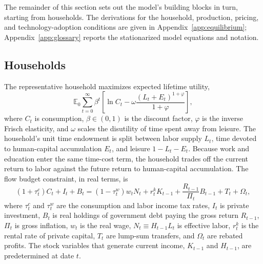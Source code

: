 \documentclass[a4paper,11pt]{article}
\begin{document}
The remainder of this section sets out the model's building blocks in turn, starting from households.
The derivations for the household, production, pricing, and technology-adoption conditions are given in Appendix~\ref{app:equilibrium}; Appendix~\ref{app:glossary} reports the stationarized model equations and notation.

\subsection{Households}

The representative household maximizes expected lifetime utility,
\begin{equation} \label{eq:utility}
    \mathbb{E}_0 \sum_{t=0}^{\infty} \beta^t \left[\ln C_t - \omega \frac{\left(L_t + E_t\right)^{1+\varphi}}{1+\varphi}\right],
\end{equation}
where $C_t$ is consumption, $\beta \in (0,1)$ is the discount factor, $\varphi$ is the inverse Frisch elasticity, and $\omega$ scales the disutility of time spent away from leisure.
The household's unit time endowment is split between labor supply $L_t$, time devoted to human-capital accumulation $E_t$, and leisure $1 - L_t - E_t$.
Because work and education enter the same time-cost term, the household trades off the current return to labor against the future return to human-capital accumulation.
The flow budget constraint, in real terms, is
\begin{equation} \label{eq:hhbudget}
    \left(1+\tau_t^{c}\right) C_t + I_t + B_t = \left(1-\tau_t^{w}\right) w_t N_t + r_t^{k} K_{t-1} + \frac{R_{t-1}}{\Pi_t} B_{t-1} + T_t + \Omega_t,
\end{equation}
where $\tau_t^{c}$ and $\tau_t^{w}$ are the consumption and labor income tax rates, $I_t$ is private investment, $B_t$ is real holdings of government debt paying the gross return $R_{t-1}$, $\Pi_t$ is gross inflation, $w_t$ is the real wage, $N_t \equiv H_{t-1} L_t$ is effective labor, $r_t^{k}$ is the rental rate of private capital, $T_t$ are lump-sum transfers, and $\Omega_t$ are rebated profits.
The stock variables that generate current income, $K_{t-1}$ and $H_{t-1}$, are predetermined at date $t$.
\end{document}
